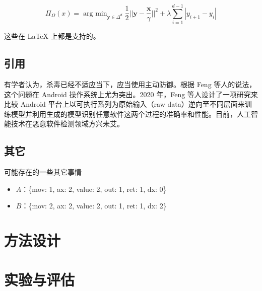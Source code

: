 \documentclass[14pt]{jnuthesis}
\begin{document}
\begin{equation*}
	\Pi_\Omega(x) = \mathop{\mathrm{arg} \text{ } \min}_{\bm{y}\in\Delta^d}\frac{1}{2}\bigg|\bigg|\bm{y} - \frac{\bm{x}}{\gamma}\bigg|\bigg|^2 + \lambda\mathop{\sum}_{i = 1}^{d - 1}|y_{i + 1} - y_i|
\end{equation*}

这些在 LaTeX 上都是支持的。

\section{引用}


有学者认为，杀毒已经不适应当下，应当使用主动防御。根据 Feng 等人的说法，这个问题在 Android 操作系统上尤为突出。2020 年，Feng 等人设计了一项研究来比较 Android 平台上以可执行系列为原始输入（raw data）逆向至不同层面来训练模型并利用生成的模型识别任意软件这两个过程的准确率和性能。目前，人工智能技术在恶意软件检测领域方兴未艾。

\section{其它}

可能存在的一些其它事情

\begin{itemize}
	\item $A$：\{\textquotesingle mov\textquotesingle: 1, \textquotesingle ax\textquotesingle: 2, \textquotesingle value\textquotesingle: 2, \textquotesingle out\textquotesingle: 1, \textquotesingle ret\textquotesingle: 1, \textquotesingle dx\textquotesingle: 0\}
	\item $B$：\{\textquotesingle mov\textquotesingle: 2, \textquotesingle ax\textquotesingle: 2, \textquotesingle value\textquotesingle: 2, \textquotesingle out\textquotesingle: 1, \textquotesingle ret\textquotesingle: 1, \textquotesingle dx\textquotesingle: 2\}
\end{itemize}

\chapter{方法设计}
\label{chap:3}

\chapter{实验与评估}
\label{chap:4}
\end{document}
